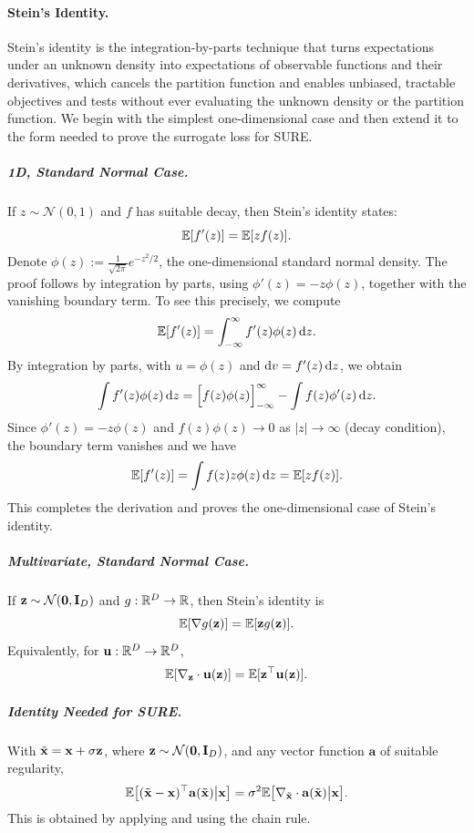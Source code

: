 \paragraph{Stein's Identity.} Stein’s identity is the integration-by-parts technique that turns expectations under an unknown density  into expectations of observable functions and their derivatives, which cancels the partition function and enables unbiased, tractable objectives and tests without ever evaluating the unknown density or the partition function. We begin with the simplest one-dimensional case and then extend it to the form needed to prove the surrogate loss for SURE.
\subparagraph{1D, Standard Normal Case.}
If $z \sim \mathcal{N}(0,1)$ and $f$ has suitable decay, then Stein's identity states:
\[
\mathbb{E}[f'(z)]  =  \mathbb{E}[z f(z)] .
\]
Denote $\phi(z) := \tfrac{1}{\sqrt{2\pi}}  e^{-z^2/2}$, the one-dimensional standard normal density.
The proof follows by integration by parts, using $\phi'(z) = -z\phi(z)$, together with the vanishing boundary term. 
To see this precisely, we compute
\[
\mathbb{E}[f'(z)] 
= \int_{-\infty}^{\infty} f'(z)  \phi(z)  \mathop{}\!\mathrm{d} z.
\]
By integration by parts, with $u=\phi(z)$ and $\mathop{}\!\mathrm{d} v=f'(z)  \mathop{}\!\mathrm{d} z$, we obtain
\[
\int f'(z)  \phi(z)  \mathop{}\!\mathrm{d} z
= \Big[ f(z)  \phi(z) \Big]_{-\infty}^{\infty}
- \int f(z)  \phi'(z)  \mathop{}\!\mathrm{d} z.
\]
Since $\phi'(z) = -z\phi(z)$ and $f(z)\phi(z)\to 0$ as $|z|\to\infty$ (decay condition), the boundary term vanishes and we have
\[
\mathbb{E}[f'(z)]  =  \int f(z)  z  \phi(z)  \mathop{}\!\mathrm{d} z  =  \mathbb{E}[z f(z)].
\]
This completes the derivation and proves the one-dimensional case of Stein's identity.


\subparagraph{Multivariate, Standard Normal Case.}
If ${\mathbf{z}} \sim \mathcal{N}(\mathbf{0},{\mathbf{I}}_D)$ and $g:\mathbb{R}^D \to \mathbb{R}$, then Stein's identity is
\[
\mathbb{E}[\nabla g({\mathbf{z}})]  =  \mathbb{E}[{\mathbf{z}} g({\mathbf{z}})].
\]
Equivalently, for $\mathbf{u}:\mathbb{R}^D \to \mathbb{R}^D$,
\begin{align}\label{eq:stein-multi}
    \mathbb{E}[ \nabla_{{\mathbf{z}}} \cdot\mathbf{u}({\mathbf{z}})]  =  \mathbb{E}[{\mathbf{z}}^\top \mathbf{u}({\mathbf{z}})] .
\end{align}


\subparagraph{Identity Needed for SURE.}
With $\tilde{{\mathbf{x}}}={\mathbf{x}}+\sigma{\mathbf{z}}$, where ${\mathbf{z}} \sim \mathcal{N}(\mathbf{0},{\mathbf{I}}_D)$, and any vector function $\mathbf{a}$ of suitable regularity,
\begin{align}\label{eq:stein-for-sure}
    \mathbb{E}\big[(\tilde{{\mathbf{x}}}-{\mathbf{x}})^\top \mathbf{a}(\tilde{{\mathbf{x}}})  \big|  {\mathbf{x}}\big]
 =  \sigma^2 \mathbb{E}\big[ \nabla_{\tilde{{\mathbf{x}}}} \cdot\mathbf{a}(\tilde{{\mathbf{x}}})  \big|  {\mathbf{x}}\big]. 
\end{align}
This is obtained by applying  and using the chain rule.

